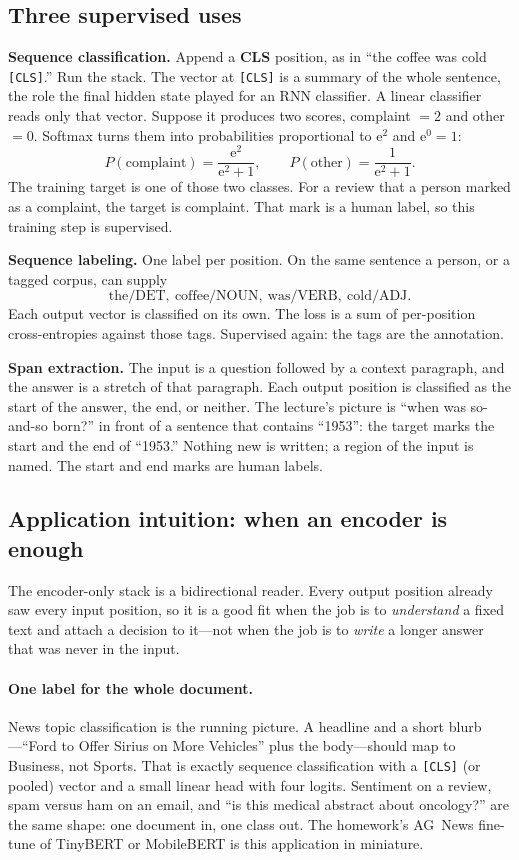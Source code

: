 \documentclass[11pt]{article}
\begin{document}
\subsection{Three supervised uses}

\textbf{Sequence classification.} Append a \textbf{CLS} position, as in
``the coffee was cold \texttt{[CLS]}.'' Run the stack. The vector at
\texttt{[CLS]} is a summary of the whole sentence, the role the final
hidden state played for an RNN classifier. A linear classifier reads only
that vector. Suppose it produces two scores, complaint \(=2\) and other
\(=0\). Softmax turns them into probabilities proportional to
\(\mathrm{e}^{2}\) and \(\mathrm{e}^{0}=1\):
\[
  P(\text{complaint})
  =
  \frac{\mathrm{e}^{2}}{\mathrm{e}^{2}+1},
  \qquad
  P(\text{other})
  =
  \frac{1}{\mathrm{e}^{2}+1}.
\]
The training target is one of those two classes. For a review that a person
marked as a complaint, the target is complaint. That mark is a human label,
so this training step is supervised.

\textbf{Sequence labeling.} One label per position. On the same sentence a
person, or a tagged corpus, can supply
\[
  \text{the/DET},\ 
  \text{coffee/NOUN},\ 
  \text{was/VERB},\ 
  \text{cold/ADJ}.
\]
Each output vector is classified on its own. The loss is a sum of
per-position cross-entropies against those tags. Supervised again: the tags
are the annotation.

\textbf{Span extraction.} The input is a question followed by a context
paragraph, and the answer is a stretch of that paragraph. Each output
position is classified as the start of the answer, the end, or neither. The
lecture's picture is ``when was so-and-so born?'' in front of a sentence
that contains ``1953'': the target marks the start and the end of
``1953.'' Nothing new is written; a region of the input is named. The start
and end marks are human labels.

\subsection{Application intuition: when an encoder is enough}

The encoder-only stack is a bidirectional reader. Every output position
already saw every input position, so it is a good fit when the job is to
\emph{understand} a fixed text and attach a decision to it---not when the
job is to \emph{write} a longer answer that was never in the input.

\paragraph{One label for the whole document.}
News topic classification is the running picture. A headline and a short
blurb---``Ford to Offer Sirius on More Vehicles'' plus the body---should
map to Business, not Sports. That is exactly sequence classification with
a \texttt{[CLS]} (or pooled) vector and a small linear head with four
logits. Sentiment on a review, spam versus ham on an email, and
``is this medical abstract about oncology?'' are the same shape: one
document in, one class out. The homework's AG~News fine-tune of TinyBERT
or MobileBERT is this application in miniature.
\end{document}
